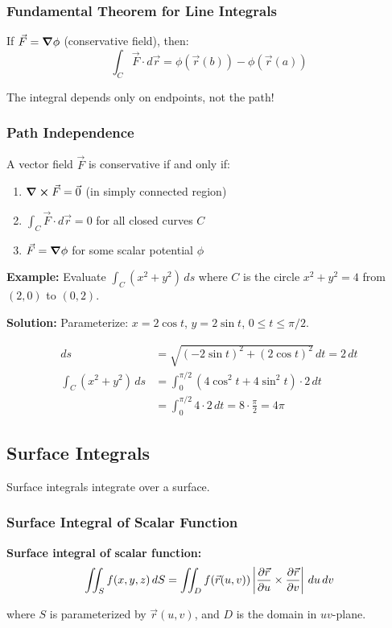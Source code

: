 \documentclass[12pt,a4paper]{article}
\begin{document}
\subsubsection{Fundamental Theorem for Line Integrals}
\begin{importantbox}
If $\vec{F} = \grad\phi$ (conservative field), then:
\begin{equation}
\int_C \vec{F} \cdot d\vec{r} = \phi(\vec{r}(b)) - \phi(\vec{r}(a))
\end{equation}

The integral depends only on endpoints, not the path!
\end{importantbox}

\subsubsection{Path Independence}
A vector field $\vec{F}$ is conservative if and only if:
\begin{enumerate}
    \item $\curl\vec{F} = \vec{0}$ (in simply connected region)
    \item $\int_C \vec{F} \cdot d\vec{r} = 0$ for all closed curves $C$
    \item $\vec{F} = \grad\phi$ for some scalar potential $\phi$
\end{enumerate}

\begin{examplebox}
\textbf{Example:} Evaluate $\int_C (x^2 + y^2) \, ds$ where $C$ is the circle $x^2 + y^2 = 4$ from $(2,0)$ to $(0,2)$.

\textbf{Solution:} Parameterize: $x = 2\cos t$, $y = 2\sin t$, $0 \leq t \leq \pi/2$.

\begin{align}
ds &= \sqrt{(-2\sin t)^2 + (2\cos t)^2} \, dt = 2 \, dt \\
\int_C (x^2 + y^2) \, ds &= \int_0^{\pi/2} (4\cos^2 t + 4\sin^2 t) \cdot 2 \, dt \\
&= \int_0^{\pi/2} 4 \cdot 2 \, dt = 8 \cdot \frac{\pi}{2} = 4\pi
\end{align}
\end{examplebox}

\subsection{Surface Integrals}
Surface integrals integrate over a surface.

\subsubsection{Surface Integral of Scalar Function}
\begin{formulabox}
\textbf{Surface integral of scalar function:}
\begin{equation}
\iint_S f(x,y,z) \, dS = \iint_D f(\vec{r}(u,v)) \left|\pdv{\vec{r}}{u} \times \pdv{\vec{r}}{v}\right| \, du \, dv
\end{equation}

where $S$ is parameterized by $\vec{r}(u,v)$, and $D$ is the domain in $uv$-plane.
\end{formulabox}
\end{document}
